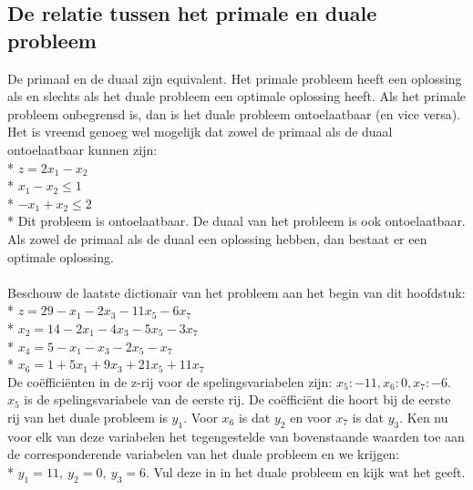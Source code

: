 \documentclass[10pt]{article}
\begin{document}
\subsection{De relatie tussen het primale en duale probleem}
De primaal en de duaal zijn equivalent. Het primale probleem heeft een oplossing als en slechts als het duale probleem een optimale oplossing heeft. Als het primale probleem onbegrensd is, dan is het duale probleem ontoelaatbaar (en vice versa). Het is vreemd genoeg wel mogelijk dat zowel de primaal als de duaal ontoelaatbaar kunnen zijn:\\*
$z = 2x_1 - x_2$\\*
$x_1 - x_2 \le 1$\\*
$-x_1 + x_2 \le 2$\\*
Dit probleem is ontoelaatbaar. De duaal van het probleem is ook ontoelaatbaar.\\
Als zowel de primaal als de duaal een oplossing hebben, dan bestaat er een optimale oplossing.\\\\
Beschouw de laatste dictionair van het probleem aan het begin van dit hoofdstuk:\\*
$z = 29 - x_1 - 2x_3 - 11x_5 - 6x_7$\\*
$x_2 = 14 - 2x_1 - 4x_3 - 5x_5 - 3x_7$\\*
$x_4 = 5 - x_1 - x_3 - 2x_5 - x_7$\\*
$x_6 = 1 + 5x_1 + 9x_3 + 21x_5 + 11x_7$\\
De co\"effici\"enten in de z-rij voor de spelingsvariabelen zijn: $x_5: -11, x_6: 0, x_7: -6$. $x_5$ is de spelingsvariabele van de eerste rij. De co\"effici\"ent die hoort bij de eerste rij van het duale probleem is $y_1$. Voor $x_6$ is dat $y_2$ en voor $x_7$ is dat $y_3$. Ken nu voor elk van deze variabelen het tegengestelde van bovenstaande waarden toe aan de corresponderende variabelen van het duale probleem en we krijgen:\\*
$y_1 = 11,\ y_2 = 0,\ y_3 = 6$. Vul deze in in het duale probleem en kijk wat het geeft.
\end{document}
